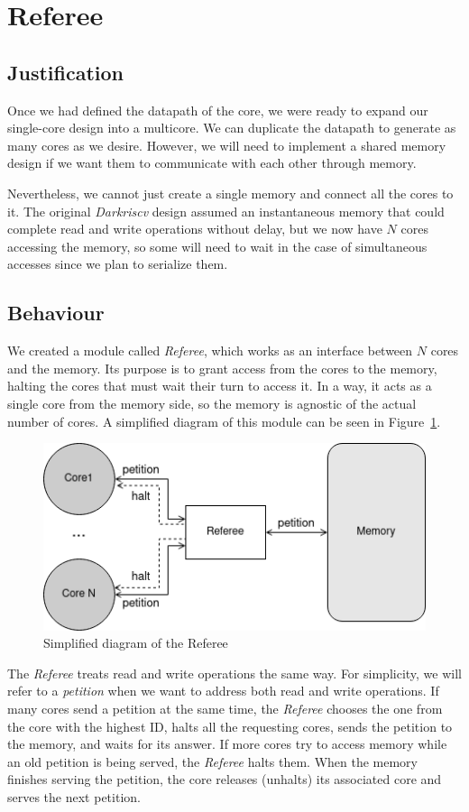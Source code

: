 \section{Referee}

\subsection{Justification} \label{referee-justification}
Once we had defined the datapath of the core, we were ready to expand our single-core design into a multicore.
We can duplicate the datapath to generate as many cores as we desire. However, we will need to implement a shared memory design if we want them to communicate with each other through memory. 

Nevertheless, we cannot just create a single memory and connect all the cores to it. 
The original \textit{Darkriscv} design assumed an instantaneous memory that could complete read and write operations without delay, but we now have $N$ cores accessing the memory, so some will need to wait in the case of simultaneous accesses since we plan to serialize them.


\subsection{Behaviour} \label{referee-behaviour}
We created a module called \textit{Referee}, which works as an interface between $N$ cores and the memory.
Its purpose is to grant access from the cores to the memory, halting the cores that must wait their turn to access it.
In a way, it acts as a single core from the memory side, so the memory is agnostic of the actual number of cores.
A simplified diagram of this module can be seen in Figure~\ref{referee-fig}.

\begin{figure}[h!]
    \centering
    \includegraphics[width=.5\textwidth]{images/Referee_fig.png}
    \caption{Simplified diagram of the Referee}
    \label{referee-fig}
\end{figure}

The \textit{Referee} treats read and write operations the same way.
For simplicity, we will refer to a \textit{petition} when we want to address both read and write operations.
If many cores send a petition at the same time, the \textit{Referee} chooses the one from the core with the highest ID, halts all the requesting cores, sends the petition to the memory, and waits for its answer.
If more cores try to access memory while an old petition is being served, the \textit{Referee} halts them.
When the memory finishes serving the petition, the core releases (unhalts) its associated core and serves the next petition.

